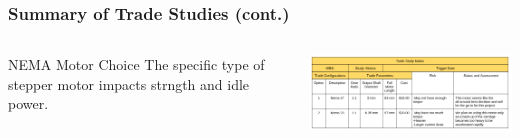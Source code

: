 \documentclass[aspectratio=169]{beamer}
\begin{document}
\begin{frame}
    \frametitle{Summary of Trade Studies (cont.)}

    \begin{columns}
        \begin{column}{0.28\textwidth}
            \begin{block}{NEMA Motor Choice}
                The specific type of stepper motor impacts strngth and idle power.
            \end{block}
        \end{column}

        \begin{column}{0.70\textwidth}
            \includegraphics[width=10.5cm]{MotorTradeStudy2}
        \end{column}
    \end{columns}

\end{frame}
\end{document}
